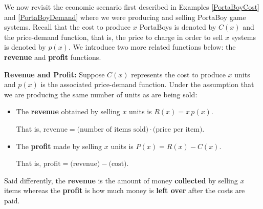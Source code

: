 \documentclass{ximera}
\begin{document}
We now revisit the economic scenario first described in Examples \ref{PortaBoyCost} and \ref{PortaBoyDemand} where we were producing and selling PortaBoy game systems. Recall that the cost to produce $x$ PortaBoys is denoted by $C(x)$ and the price-demand function, that is, the price to charge in order  to sell $x$ systems is  denoted by $p(x)$. We introduce two more related functions below:  the \textbf{revenue} and \textbf{profit} functions.

\medskip


\begin{definition}  \textbf{Revenue and Profit:}  Suppose $C(x)$ represents the cost to produce $x$ units and $p(x)$ is the associated price-demand function.  Under the assumption that we are producing the same number of units as are being sold: \label{revenueprofitdefns}   

\begin{itemize}

\item The  \textbf{revenue} obtained by selling $x$ units is $R(x) = x \, p(x)$.

That is, $\text{revenue} = \text{(number of items sold)} \cdot \text{(price per item)}.$

\item The  \textbf{profit} made by selling $x$ units is $P(x) = R(x) - C(x)$.

That is, $\text{profit} = \text{(revenue)}  - \text{(cost)}.$

\end{itemize}

\end{definition}


\medskip

Said differently, the \textbf{revenue} is the amount of money \textbf{collected} by selling $x$ items whereas the \textbf{profit} is how much money is \textbf{left over} after the costs are paid.
 
\end{document}
